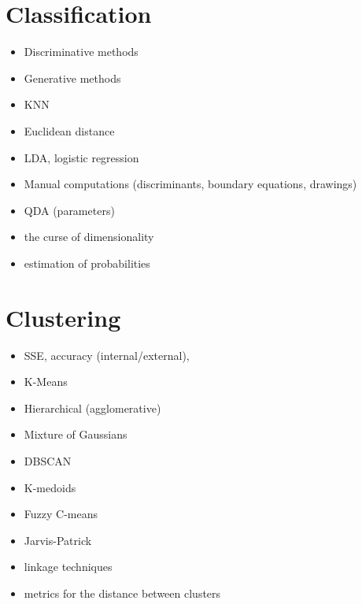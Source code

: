 \documentclass[a4paper,12pt,titlepage]{article} %
\begin{document}
\newpage
\section{Classification}
\begin{itemize}
	\item Discriminative methods
	\item Generative methods
	\item KNN
	\item Euclidean distance
	\item LDA, logistic regression
	\item Manual computations (discriminants, boundary equations, drawings)
	\item QDA (parameters)
	\item the curse of dimensionality
	\item estimation of probabilities
\end{itemize}

\newpage
\section{Clustering}
\begin{itemize}
	\item SSE, accuracy (internal/external),
	\item K-Means
	\item Hierarchical (agglomerative)
	\item Mixture of Gaussians
	\item DBSCAN
	\item K-medoids
	\item Fuzzy C-means
	\item Jarvis-Patrick
	\item linkage techniques
	\item metrics for the distance between clusters
\end{itemize}

\end{document}
